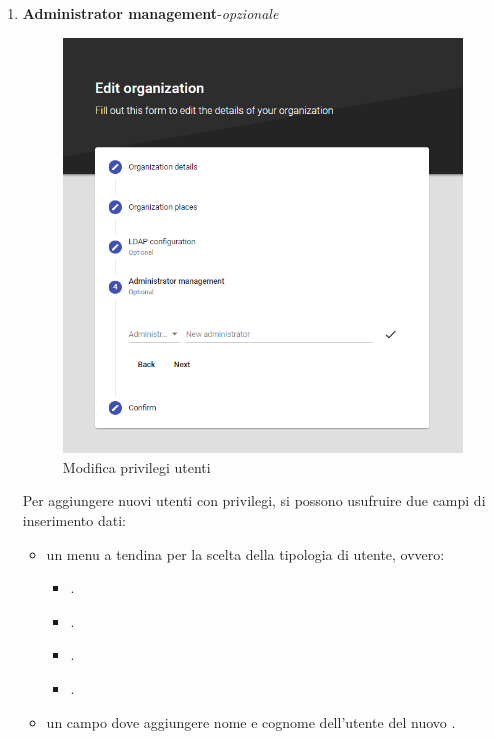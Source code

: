 \documentclass[../manuale-utente.tex]{subfiles}
\begin{document}
\begin{enumerate}
    \item \textbf{Administrator management}-\textit{opzionale}
    
    \begin{figure}[H]
        \centering
        \includegraphics[width=120mm]{img/web-app/edit-organization/4-privilegi.png}
        \caption{Modifica privilegi utenti}%
        \label{fig:web_app_modifica_privilegi_utenti}
    \end{figure}

    Per aggiungere nuovi utenti con privilegi, si possono usufruire due campi di inserimento dati:
    \begin{itemize}
        \item un menu a tendina per la scelta della tipologia di utente, ovvero:
        \begin{itemize}
            \item {}.
            \item {}.
            \item {}.
            \item {}.
        \end{itemize}
        \item un campo dove aggiungere nome e cognome dell'utente del nuovo .
    \end{itemize}


\end{enumerate}
\end{document}
